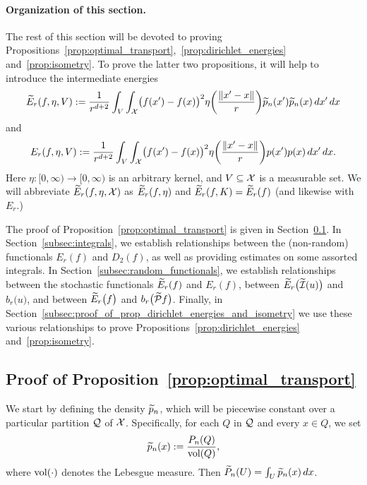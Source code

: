 \paragraph{Organization of this section.}
The rest of this section will be devoted to proving Propositions~\ref{prop:optimal_transport},~\ref{prop:dirichlet_energies} and~\ref{prop:isometry}. To prove the latter two propositions, it will help to introduce the intermediate energies
\begin{equation*}
\widetilde{E}_r(f,\eta,V) := \frac{1}{r^{d + 2}}\int_{V} \int_{\mathcal{X}} \bigl(f(x') - f(x)\bigr)^2 \eta\biggl(\frac{\|x' - x\|}{r}\biggr) \widetilde{p}_n(x') \widetilde{p}_n(x) \,dx' \,dx
\end{equation*}
and
\begin{equation*}
{E}_r(f,\eta,V) := \frac{1}{r^{d + 2}}\int_{V} \int_{\mathcal{X}} \bigl(f(x') - f(x)\bigr)^2 \eta\biggl(\frac{\|x' - x\|}{r}\biggr) p(x') p(x) \,dx' \,dx.
\end{equation*}
Here $\eta: [0,\infty) \to [0,\infty)$ is an arbitrary kernel, and $V \subseteq \mathcal{X}$ is a measurable set. We will abbreviate $\widetilde{E}_r(f,\eta,\mathcal{X})$ as $\widetilde{E}_r(f,\eta)$ and $\widetilde{E}_r(f,K) = \widetilde{E}_r(f)$ (and likewise with $E_r$.)

The proof of Proposition~\ref{prop:optimal_transport} is given in Section~\ref{subsec:proof_proposition_optimal_transport}. In Section~\ref{subsec:integrals}, we establish relationships between the (non-random) functionals $E_r(f)$ and $D_2(f)$, as well as providing estimates on some assorted integrals. In Section~\ref{subsec:random_functionals}, we establish relationships between the stochastic functionals $\widetilde{E}_r(f)$ and $E_r(f)$,  between $\widetilde{E}_r\bigl(\widetilde{\mathcal{I}}(u)\bigr)$ and $b_r\bigl(u\bigr)$, and between $\widetilde{E}_r\bigl(f\bigr)$ and $b_r\bigl(\widetilde{\mathcal{P}}f\bigr)$. Finally, in Section~\ref{subsec:proof_of_prop_dirichlet_energies_and_isometry} we use these various relationships to prove Propositions~\ref{prop:dirichlet_energies} and~\ref{prop:isometry}.

\subsection{Proof of Proposition~\ref{prop:optimal_transport}}
\label{subsec:proof_proposition_optimal_transport}

We start by defining the density $\widetilde{p}_n$, which will be piecewise constant over a particular partition $\mathcal{Q}$ of $\mathcal{X}$. Specifically, for each $Q$ in $\mathcal{Q}$ and every $x \in Q$, we set
\begin{equation}
\label{pf:prop_optimal_transport_0}
\widetilde{p}_n(x) := \frac{P_n(Q)}{\text{vol}(Q)},
\end{equation}
where $\text{vol}(\cdot)$ denotes the Lebesgue measure. Then $\widetilde{P}_n(U) = \int_{U} \widetilde{p}_n(x) \,dx$.

